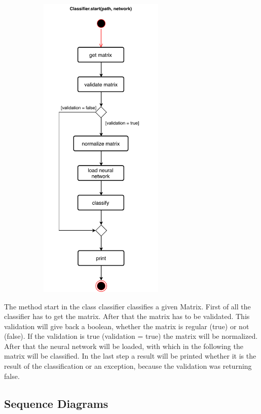 \documentclass[parskip=full]{scrartcl}
\begin{document}
\begin{figure}[h]
\begin{center}
\includegraphics[width=8cm,height=15cm,keepaspectratio]{ActivityDiagrams/PDF/classification_activity_diagram}
\label{Activity Diagrams}
\end{center}
\end{figure}

\newpage
The method start in the class classifier classifies a given Matrix.
First of all the classifier has to get the matrix. 
After that the matrix has to be validated.
This validation will give back a boolean, whether the matrix is regular (true) or not (false).
If the validation is true (validation = true) the matrix will be normalized.
After that the \gls{neural network} will be loaded, with which in the following the matrix will be classified.
In the last step a result will be printed whether it is the result of the classification or an exception, because the validation was returning false.

 
\newpage
\subsection{Sequence Diagrams} 
\end{document}
